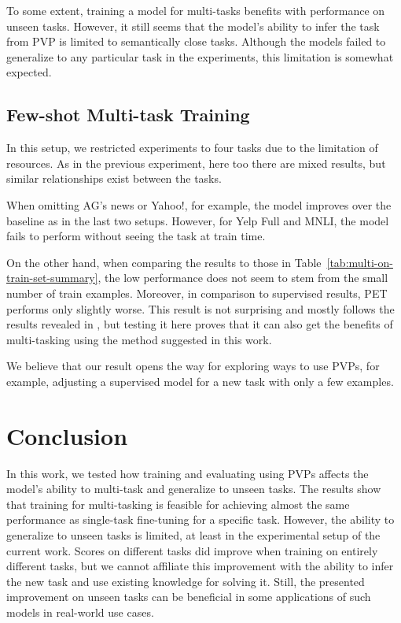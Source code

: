 \documentclass[11pt,a4paper]{article}
\begin{document}
To some extent, training a model for multi-tasks benefits with performance on unseen tasks.
However, it still seems that the model's ability to infer the task from PVP is limited to semantically close tasks.
Although the models failed to generalize to any particular task in the experiments, this limitation is somewhat expected.

\subsection{Few-shot Multi-task Training}
In this setup, we restricted experiments to four tasks due to the limitation of resources.
As in the previous experiment, here too there are mixed results, but similar relationships exist between the tasks.

When omitting AG's news or Yahoo!, for example, the model improves over the baseline as in the last two setups.
However, for Yelp Full and MNLI, the model fails to perform without seeing the task at train time.

On the other hand, when comparing the results to those in Table~\ref{tab:multi-on-train-set-summary},
the low performance does not seem to stem from the small number of train examples.
Moreover, in comparison to supervised results, PET performs only slightly worse.
This result is not surprising and mostly follows the results revealed in \citet{schick2020exploiting}, but testing it here proves that it can also get the benefits of multi-tasking using the method suggested in this work.

We believe that our result opens the way for exploring ways to use PVPs, for example, adjusting a supervised model for a new task with only a few examples.
\section{Conclusion}
In this work, we tested how training and evaluating using PVPs affects the model's ability to multi-task and generalize to unseen tasks.
The results show that training for multi-tasking is feasible for achieving almost the same performance as single-task fine-tuning for a specific task.
However, the ability to generalize to unseen tasks is limited, at least in the experimental setup of the current work.
Scores on different tasks did improve when training on entirely different tasks, but we cannot affiliate this improvement with the ability to infer the new task and use existing knowledge for solving it. 
Still, the presented improvement on unseen tasks can be beneficial in some applications of such models in real-world use cases. 
\end{document}
